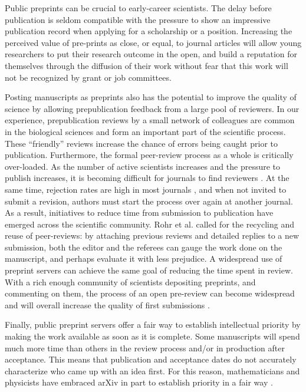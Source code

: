 \documentclass[letterpaper]{article}
\begin{document}
Public preprints can be crucial to early-career scientists. The delay before
publication is seldom compatible with the pressure to show an impressive
publication record when applying for a scholarship or a position. Increasing the
perceived value of pre-prints as close, or equal, to journal articles will allow
young researchers to put their research outcome in the open, and build a
reputation for themselves through the diffusion of their work without fear that
this work will not be recognized by grant or job committees.

Posting manuscripts as preprints also has the potential to improve the 
quality of science by allowing prepublication feedback from a large pool of 
reviewers. In our experience, prepublication reviews by a small network of 
colleagues are common in the biological sciences and form an important part 
of the scientific process. These ``friendly'' reviews increase the chance 
of errors being caught prior to publication. Furthermore, the formal 
peer-review process as a whole is critically over-loaded. As the number of 
active scientists increases and the pressure to publish increases, it is 
becoming difficult for journals to find reviewers \cite{hoc09}.  At the same 
time, rejection rates are high in most journals \cite{aar08,roh09}, and when 
not invited to submit a revision, authors must start the process over again 
at another journal. As a result, initiatives to reduce time from submission 
to publication have emerged across the scientific community. Rohr et al.  
\cite{roh09} called for the recycling and reuse of peer-reviews: by 
attaching previous reviews and detailed replies to a new submission, both 
the editor and the referees can gauge the work done on the manuscript, and 
perhaps evaluate it with less prejudice. A widespread use of preprint 
servers can achieve the same goal of reducing the time spent in review. With 
a rich enough community of scientists depositing preprints, and commenting 
on them, the process of an open pre-review can become widespread and will 
overall increase the quality of first submissions \cite{hoc12}.

Finally, public preprint servers offer a fair way to establish intellectual
priority by making the work available as soon as it is complete. Some
manuscripts will spend much more time than others in the review process and/or in
production after acceptance. This means that publication and
acceptance dates do not accurately characterize who came up with an idea
first. For this reason, mathematicians and physicists have embraced arXiv in
part to establish priority in a fair way \cite{gin11,cal12}.
\end{document}
